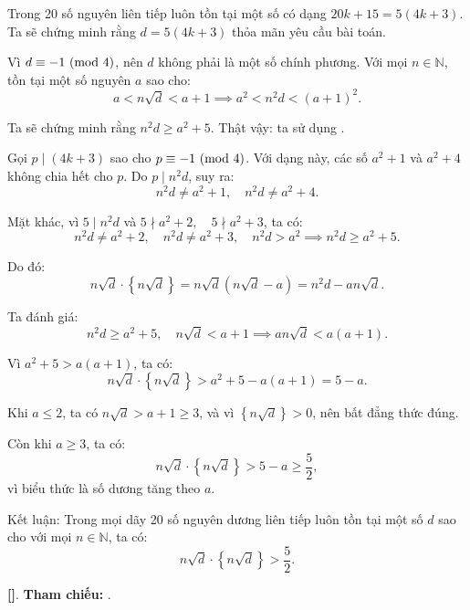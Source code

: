 \documentclass[../2015-n-s.tex]{subfiles}
\begin{document}
\begin{soln}
    Trong 20 số nguyên liên tiếp luôn tồn tại một số có dạng \( 20k + 15 = 5(4k + 3) \). Ta sẽ chứng minh rằng \( d = 5(4k + 3) \) thỏa mãn yêu cầu bài toán.

    Vì \( d \equiv -1 \ (\mathrm{mod}\ 4) \), nên \( d \) không phải là một số chính phương. Với mọi \( n \in \mathbb{N} \), tồn tại một số nguyên \( a \) sao cho:
    \[
        a < n\sqrt{d} < a + 1 \implies a^2 < n^2 d < (a + 1)^2.
    \]

    Ta sẽ chứng minh rằng \( n^2 d \geq a^2 + 5 \). Thật vậy: ta sử dụng .

    Gọi \( p \mid (4k + 3) \) sao cho \( p \equiv -1 \ (\mathrm{mod}\ 4) \). Với dạng này, các số \( a^2 + 1 \) và \( a^2 + 4 \) không chia hết cho \( p \). Do \( p \mid n^2 d \), suy ra:
    \[
        n^2 d \ne a^2 + 1, \quad n^2 d \ne a^2 + 4.
    \]

    Mặt khác, vì \( 5 \mid n^2 d \) và \( 5 \nmid a^2 + 2, \quad 5 \nmid a^2 + 3 \), ta có:
    \[
        n^2 d \ne a^2 + 2, \quad n^2 d \ne a^2 + 3, \quad  n^2 d > a^2 \implies n^2 d \geq a^2 + 5.
    \]

    Do đó:
    \[
        n\sqrt{d} \cdot \left\{n\sqrt{d}\right\}
        = n\sqrt{d}(n\sqrt{d} - a)
        = n^2 d - a n\sqrt{d}.
    \]

    Ta đánh giá:
    \[
        n^2 d \geq a^2 + 5, \quad n\sqrt{d} < a + 1 \implies a n\sqrt{d} < a(a + 1).
    \]

    Vì \( a^2 + 5 > a(a + 1) \), ta có:
    \[
        n\sqrt{d} \cdot \left\{n\sqrt{d}\right\} > a^2 + 5 - a(a + 1) = 5 - a.
    \]

    Khi \( a \leq 2 \), ta có \( n\sqrt{d} > a + 1 \geq 3 \), và vì \( \left\{ n\sqrt{d} \right\} > 0 \), nên bất đẳng thức đúng.

    Còn khi \( a \geq 3 \), ta có:
    \[
        n\sqrt{d} \cdot \left\{n\sqrt{d}\right\} > 5 - a \geq \frac{5}{2},
    \]
    vì biểu thức là số dương tăng theo \( a \).

    Kết luận: Trong mọi dãy 20 số nguyên dương liên tiếp luôn tồn tại một số \( d \) sao cho với mọi \( n \in \mathbb{N} \), ta có:
    \[
        n\sqrt{d} \cdot \left\{n\sqrt{d}\right\} > \frac{5}{2}.
    \]

    \vspace{1em}
    \textbf{[]}.
    \textbf{Tham chiếu:} .    
\end{soln}

\end{document}
